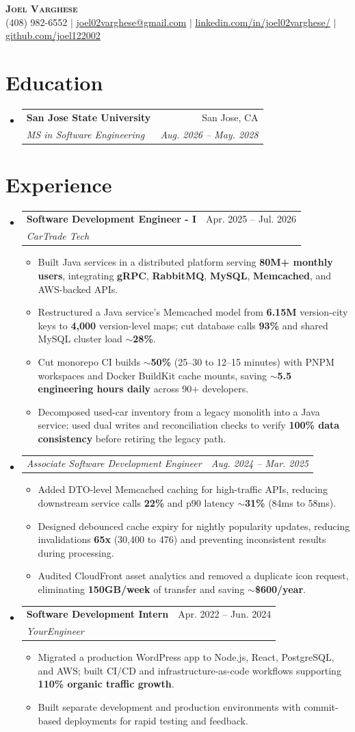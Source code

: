 \documentclass[letterpaper,11pt]{article}
\makeatletter
\newcommand{\resumeItem}[1]{
  \item\small{
    {#1 \vspace{-2pt}}
  }
}
\newcommand{\resumeSubheading}[4]{
  \vspace{-2pt}\item
    \begin{tabular*}{0.97\textwidth}[t]{l@{\extracolsep{\fill}}r}
      \textbf{#1} & #2 \\
      \textit{\small#3} & \textit{\small #4} \\
    \end{tabular*}\vspace{-7pt}
}
\newcommand{\resumeSubSubheading}[2]{
    \item
    \begin{tabular*}{0.97\textwidth}{l@{\extracolsep{\fill}}r}
      \textit{\small#1} & \textit{\small #2} \\
    \end{tabular*}\vspace{-7pt}
}
\newcommand{\resumeSubHeadingListStart}{\begin{itemize}[leftmargin=0.15in, label={}]}
\newcommand{\resumeSubHeadingListEnd}{\end{itemize}}
\newcommand{\resumeItemListStart}{\begin{itemize}}
\newcommand{\resumeItemListEnd}{\end{itemize}\vspace{-5pt}}
\makeatother
\begin{document}
\begin{center}
  \textbf{\Huge \scshape Joel Varghese} \\ \vspace{1pt}
  \small (408) 982-6552 $|$ \href{mailto:joel02varghese@gmail.com}{\underline{joel02varghese@gmail.com}} $|$
  \href{https://www.linkedin.com/in/joel02varghese/}{\underline{linkedin.com/in/joel02varghese/}} $|$
  \href{https://github.com/joel122002}{\underline{github.com/joel122002}}
\end{center}

\section{Education}
\resumeSubHeadingListStart
\resumeSubheading
{San Jose State University}{San Jose, CA}
{MS in Software Engineering}{Aug. 2026 -- May. 2028}
\resumeSubHeadingListEnd

\section{Experience}
\resumeSubHeadingListStart
\resumeSubheading
{Software Development Engineer - I}{Apr. 2025 -- Jul. 2026}
{CarTrade Tech}{}
\resumeItemListStart
\resumeItem{Built Java services in a distributed platform serving \textbf{80M+ monthly users}, integrating \textbf{gRPC}, \textbf{RabbitMQ}, \textbf{MySQL}, \textbf{Memcached}, and AWS-backed APIs.}
\resumeItem{Restructured a Java service's Memcached model from \textbf{6.15M} version-city keys to \textbf{4,000} version-level maps; cut database calls \textbf{93\%} and shared MySQL cluster load \textbf{$\sim$28\%}.}
\resumeItem{Cut monorepo CI builds \textbf{$\sim$50\%} (25--30 to 12--15 minutes) with PNPM workspaces and Docker BuildKit cache mounts, saving \textbf{$\sim$5.5 engineering hours daily} across 90+ developers.}
\resumeItem{Decomposed used-car inventory from a legacy monolith into a Java service; used dual writes and reconciliation checks to verify \textbf{100\% data consistency} before retiring the legacy path.}
\resumeItemListEnd
\resumeSubSubheading{Associate Software Development Engineer}{Aug. 2024 -- Mar. 2025}
\resumeItemListStart
\resumeItem{Added DTO-level Memcached caching for high-traffic APIs, reducing downstream service calls \textbf{22\%} and p90 latency \textbf{$\sim$31\%} (84ms to 58ms).}
\resumeItem{Designed debounced cache expiry for nightly popularity updates, reducing invalidations \textbf{65x} (30,400 to 476) and preventing inconsistent results during processing.}
\resumeItem{Audited CloudFront asset analytics and removed a duplicate icon request, eliminating \textbf{150GB/week} of transfer and saving \textbf{$\sim$\$600/year}.}
\resumeItemListEnd
\resumeSubheading
{Software Development Intern}{Apr. 2022 -- Jun. 2024}
{YourEngineer}{}
\resumeItemListStart
\resumeItem{Migrated a production WordPress app to Node.js, React, PostgreSQL, and AWS; built CI/CD and infrastructure-as-code workflows supporting \textbf{110\% organic traffic growth}.}
\resumeItem{Built separate development and production environments with commit-based deployments for rapid testing and feedback.}
\resumeItemListEnd
\resumeSubHeadingListEnd
\end{document}
